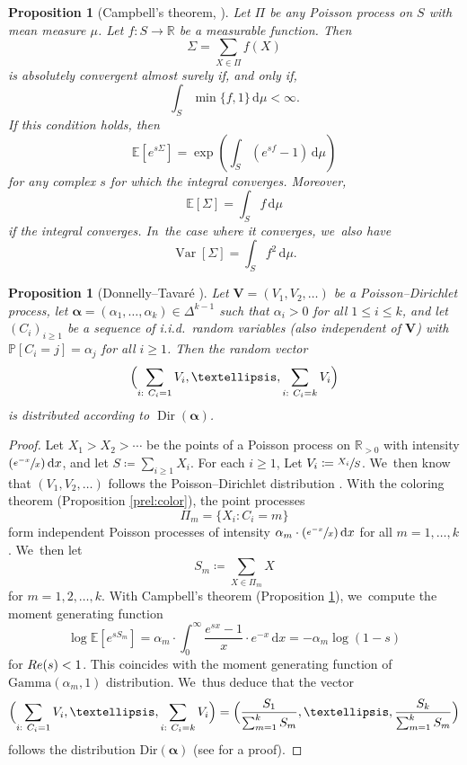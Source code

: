 \documentclass[10pt,a4paper]{article}
\newcommand{\bV}{{\boldsymbol V}}
\newcommand{\Psfrac}[2]{(\sfrac{#1}{#2})}
\newcommand{\RR}{\mathbb{R}}
\newcommand{\PP}{\mathbb{P}}
\newcommand{\EE}{\mathbb{E}}
\newcommand{\boldalpha}{\boldsymbol{\alpha}}
\newcommand{\riemint}[4]{\int_{#1}^{#2}\! #3 \, \mathrm{d}#4}
\renewcommand{\Re}{\textup{Re}}
\newcommand{\simplex}{\Delta^{k-1}}
\DeclareMathOperator{\vard}{Var}
\DeclareMathOperator{\Dir}{Dir}
\theoremstyle{plain}
\newtheorem{prop}[cor]{Proposition}
\theoremstyle{definition}
\begin{document}
\begin{prop}[Campbell's theorem, {\cite[\S3.2]{Kingman93}}]
\label{prel:campbell}
Let $\Pi$ be any Poisson process on $S$ with mean measure $\mu$. Let $f\colon S \to \RR$ be a measurable function. Then
\[
\Sigma = \sum_{X \in \Pi} f(X)
\]
is absolutely convergent almost surely if, and only if,
\[
\riemint{S}{}{\min\{f, 1\}}{\mu} < \infty.
\]
If this condition holds, then
\[
\EE[e^{s\Sigma}] = \exp\left(\riemint{S}{}{(e^{sf} - 1)}{\mu}\right)
\]
for any complex $s$ for which the integral converges. Moreover,
\[
\EE[\Sigma] = \riemint{S}{}{f}{\mu}
\]
if the integral converges. In~the case where it converges, we~also have
\[
\vard[\Sigma] = \riemint{S}{}{f^2}{\mu}.
\]
\end{prop}

\begin{prop}[Donnelly--Tavaré \cite{DonnellyTavare87}]
\label{prop:probabilistic dirichlet law}
Let $\bV = (V_1, V_2, \ldots)$ be a Poisson--Dirichlet process, let $\boldalpha = (\alpha_1, \ldots, \alpha_k) \in \simplex$ such that $\alpha_i > 0$ for all $1 \le i \le k$, and let $(C_i)_{i \ge 1}$ be a sequence of i.i.d.~random variables (also independent of $\bV$) with $\PP[C_i = j] = \alpha_j$ for all $i \ge 1$. Then the random vector
\[
\Bigl(\sum_{i:\ C_i = 1} V_i, \ldots, \sum_{i:\ C_i = k} V_i\Bigr)
\]
is distributed according to $\Dir(\boldalpha)$.
\end{prop}

\begin{proof}
Let $X_1 > X_2 > \cdots$ be the points of a Poisson process on $\RR_{>0}$ with intensity $\Psfrac{e^{-x}}{x} \, \mathrm dx$, and let $S \coloneqq \sum_{i \ge 1} X_i$. For each $i \ge 1$, Let $V_i \coloneqq \sfrac{X_i}{S}$. We~then know that $(V_1, V_2, \ldots)$ follows the Poisson--Dirichlet distribution \cite[Th.\,2.2]{Feng10}. With the coloring theorem (Proposition \ref{prel:color}), the point processes
\[
\Pi_m = \{X_i : C_i = m\}
\]
form independent Poisson processes of intensity $\alpha_m\cdot \Psfrac{e^{-x}}{x} \, \mathrm dx$ for all $m = 1, \ldots, k$. We~then let
\[
S_m \coloneqq \sum_{X \in \Pi_m} X
\]
for $m=1,2,\dots,k$. With Campbell's theorem (Proposition \ref{prel:campbell}), we~compute the moment generating function
\[
\log \EE[e^{sS_m}] = \alpha_m\cdot \riemint{0}{\infty}{\frac{e^{sx}-1}{x}\cdot e^{-x}}{x} = -\alpha_m\log(1-s)
\]
for $\Re(s) < 1$. This coincides with the moment generating function of $\text{Gamma}(\alpha_m, 1)$ distribution. We~thus deduce that the vector
\[
\Bigl(\sum_{i:\ C_i = 1} V_i, \ldots, \sum_{i:\ C_i = k} V_i \Bigr) = \Bigl(\frac{S_1}{\sum_{m=1}^k S_m}, \ldots, \frac{S_k}{\sum_{m=1}^k S_m} \Bigr)
\]
follows the distribution $\text{Dir}(\boldalpha)$ (see \cite[Ch.\,49, pp.\,485-487]{KotzBal00} for a proof).
\end{proof}
\end{document}
